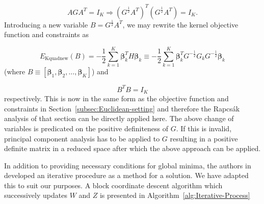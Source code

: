 \begin{equation}
AGA^{T}=I_{K}\Rightarrow\left(G^{\frac{1}{2}}A^{T}\right)^{T}\left(G^{\frac{1}{2}}A^{T}\right)=I_{K}.
\end{equation}
Introducing a new variable $B=G^{\frac{1}{2}}A^{T}$, we may rewrite
the kernel objective function and constraints as

\begin{equation}
E_{\mathrm{Kquadnew}}(B)=-\frac{1}{2}\sum_{k=1}^{K}\boldsymbol{\beta}_{k}^{T}H\boldsymbol{\beta}_{k}\equiv-\frac{1}{2}\sum_{k=1}^{K}\boldsymbol{\beta}_{k}^{T}G^{-\frac{1}{2}}G_{k}G^{-\frac{1}{2}}\boldsymbol{\beta}_{k}\label{eq:EKquadnew}
\end{equation}
(where $B\equiv\left[\boldsymbol{\beta}_{1},\boldsymbol{\beta}_{2},\ldots,\boldsymbol{\beta}_{K}\right]$)
and

\begin{equation}
B^{T}B=I_{K}\label{eq:Bconstraints}
\end{equation}
respectively. This is now in the same form as the objective function
and constraints in Section~\ref{subsec:Euclidean-setting} and therefore
the Rapcs\'{a}k analysis of that section can be directly applied
here. The above change of variables is predicated on the positive
definiteness of $G$. If this is invalid, principal component analysis
has to be applied to $G$ resulting in a positive definite matrix
in a reduced space after which the above approach can be applied. 

In addition to providing necessary conditions for global minima, the
authors in \citep{BollaMichaletzkyTusnadyEtAl1998} developed an iterative
procedure as a method for a solution. We have adapted this to suit
our purposes. A block coordinate descent algorithm which successively
updates $W$ and $Z$ is presented in Algorithm~\ref{alg:Iterative-Process}

